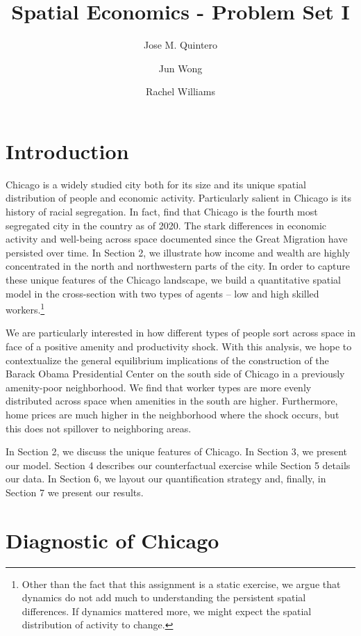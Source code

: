 \documentclass[12pt]{article}
\title{Spatial Economics - Problem Set I}
\author{Jose M. Quintero \and Jun Wong \and Rachel Williams}
\begin{document}
\maketitle

\section{Introduction}



Chicago is a widely studied city both for its size and its unique spatial distribution of people and economic activity. Particularly salient in Chicago is its history of racial segregation. In fact, \citet{seg2021} find that Chicago is the fourth most segregated city in the country as of 2020. The stark differences in economic activity and well-being across space documented since the Great Migration have persisted over time. In Section 2, we illustrate how income and wealth are highly concentrated in the north and northwestern parts of the city. In order to capture these unique features of the Chicago landscape, we build a quantitative spatial model in the cross-section with two types of agents -- low and high skilled workers.\footnote{Other than the fact that this assignment is a static exercise, we argue that dynamics do not add much to understanding the persistent spatial differences. If dynamics mattered more, we might expect the spatial distribution of activity to change.} 

We are particularly interested in how different types of people sort across space in face of a positive amenity and productivity shock. With this analysis, we hope to contextualize the general equilibrium implications of the construction of the Barack Obama Presidential Center on the south side of Chicago in a previously amenity-poor neighborhood. We find that worker types are more evenly distributed across space when amenities in the south are higher. Furthermore, home prices are much higher in the neighborhood where the shock occurs, but this does not spillover to neighboring areas.  

In Section 2, we discuss the unique features of Chicago. In Section 3, we present our model. Section 4 describes our counterfactual exercise while Section 5 details our data. In Section 6, we layout our quantification strategy and, finally, in Section 7 we present our results. 


\section{Diagnostic of Chicago}
\end{document}
